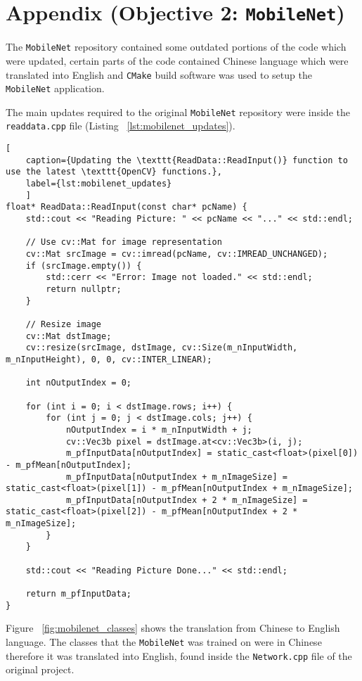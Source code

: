 \newpage
\section{Appendix (Objective 2: \texttt{MobileNet})}

The \texttt{MobileNet} repository\cite{mobilenet_repo} contained some outdated portions of the code which were updated, certain parts of the code contained Chinese language which were translated into English and \texttt{CMake} build software was used to setup the \texttt{MobileNet} application. 

The main updates required to the original \texttt{MobileNet} repository\cite{mobilenet_repo} were inside the \texttt{readdata.cpp} file (Listing ~\ref{lst:mobilenet_updates}). 

\begin{lstlisting}[
	caption={Updating the \texttt{ReadData::ReadInput()} function to use the latest \texttt{OpenCV} functions.},
	label={lst:mobilenet_updates}
	]
float* ReadData::ReadInput(const char* pcName) {
	std::cout << "Reading Picture: " << pcName << "..." << std::endl;
	
	// Use cv::Mat for image representation
	cv::Mat srcImage = cv::imread(pcName, cv::IMREAD_UNCHANGED);
	if (srcImage.empty()) {
		std::cerr << "Error: Image not loaded." << std::endl;
		return nullptr;
	}
	
	// Resize image
	cv::Mat dstImage;
	cv::resize(srcImage, dstImage, cv::Size(m_nInputWidth, m_nInputHeight), 0, 0, cv::INTER_LINEAR);
	
	int nOutputIndex = 0;
	
	for (int i = 0; i < dstImage.rows; i++) {
		for (int j = 0; j < dstImage.cols; j++) {
			nOutputIndex = i * m_nInputWidth + j;
			cv::Vec3b pixel = dstImage.at<cv::Vec3b>(i, j);
			m_pfInputData[nOutputIndex] = static_cast<float>(pixel[0]) - m_pfMean[nOutputIndex];
			m_pfInputData[nOutputIndex + m_nImageSize] = static_cast<float>(pixel[1]) - m_pfMean[nOutputIndex + m_nImageSize];
			m_pfInputData[nOutputIndex + 2 * m_nImageSize] = static_cast<float>(pixel[2]) - m_pfMean[nOutputIndex + 2 * m_nImageSize];
		}
	}
	
	std::cout << "Reading Picture Done..." << std::endl;
	
	return m_pfInputData;
}
\end{lstlisting}

Figure ~\ref{fig:mobilenet_classes} shows the translation from Chinese to English language. The classes that the \texttt{MobileNet} was trained on were in Chinese therefore it was translated into English, found inside the \texttt{Network.cpp} file of the original project\cite{mobilenet_repo}. 


